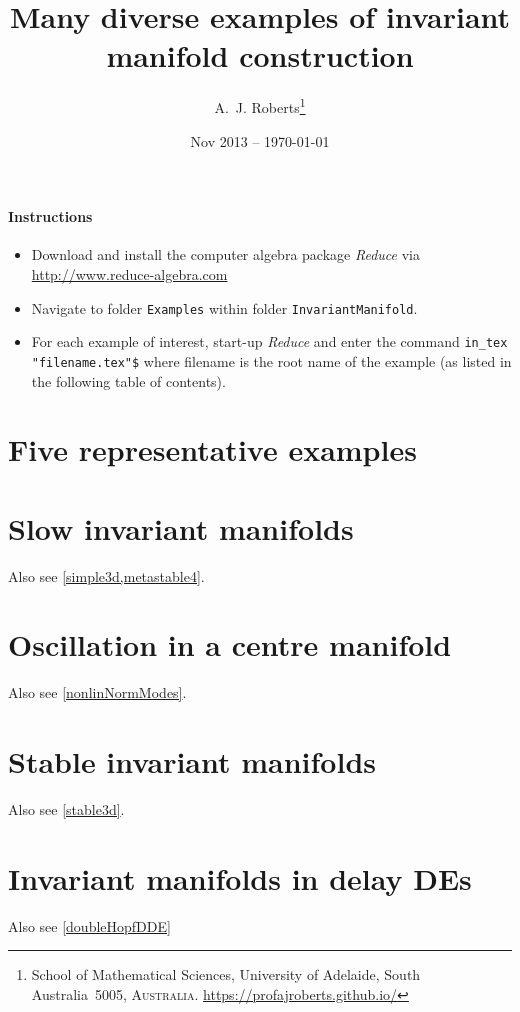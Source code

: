 \documentclass[11pt,a4paper]{refart}
\title{Many diverse examples of invariant manifold construction}
\author{A.~J. Roberts\thanks{School of Mathematical Sciences, University of Adelaide, South Australia~5005, \textsc{Australia}.
\url{https://profajroberts.github.io/}}}
\date{Nov 2013 -- \today}
\begin{document}
\maketitle


\paragraph{Instructions}
\begin{itemize}
\item Download and install the computer algebra package
\emph{Reduce} via \url{http://www.reduce-algebra.com}

\item Navigate to folder \verb|Examples| within folder \verb|InvariantManifold|.

\item For each example of interest, start-up \emph{Reduce} and enter the command \verb|in_tex "filename.tex"$|  where filename is the root name of the example (as listed in the following table of contents).

\end{itemize}


\tableofcontents




\section{Five representative examples}












\section{Slow invariant manifolds}

Also see \cref{simple3d,metastable4}.






\section{Oscillation in a centre manifold}

Also see \cref{nonlinNormModes}.








\section{Stable invariant manifolds}

Also see \cref{stable3d}.




\section{Invariant manifolds in delay DEs}

Also see \cref{doubleHopfDDE}






\end{document}

